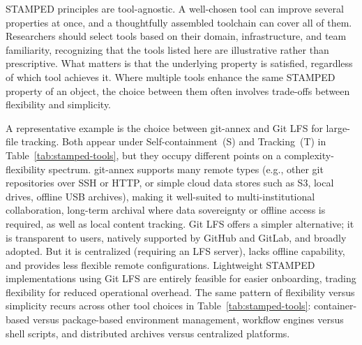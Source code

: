 \documentclass{article}
\begin{document}
STAMPED principles are tool-agnostic.
A well-chosen tool can improve several properties at once, and a thoughtfully assembled toolchain can cover all of them.
Researchers should select tools based on their domain, infrastructure, and team familiarity, recognizing that the tools listed here are illustrative rather than prescriptive.
What matters is that the underlying property is satisfied, regardless of which tool achieves it.
Where multiple tools enhance the same STAMPED property of an object, the choice between them often involves trade-offs between flexibility and simplicity.

A representative example is the choice between git-annex and Git LFS for large-file tracking.
Both appear under Self-containment~(S) and Tracking~(T) in Table~\ref{tab:stamped-tools}, but they occupy different points on a complexity-flexibility spectrum.
git-annex supports many remote types (e.g., other git repositories over SSH or HTTP, or simple cloud data stores such as S3, local drives, offline USB archives), making it well-suited to multi-institutional collaboration, long-term archival where data sovereignty or offline access is required, as well as local content tracking.
Git LFS offers a simpler alternative; it is transparent to users, natively supported by GitHub and GitLab, and broadly adopted.
But it is centralized (requiring an LFS server), lacks offline capability, and provides less flexible remote configurations.
Lightweight STAMPED implementations using Git LFS are entirely feasible for easier onboarding, trading flexibility for reduced operational overhead.
The same pattern of flexibility versus simplicity recurs across other tool choices in Table~\ref{tab:stamped-tools}: container-based versus package-based environment management, workflow engines versus shell scripts, and distributed archives versus centralized platforms.
\end{document}
